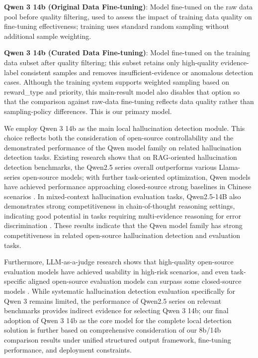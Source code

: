 \documentclass[11pt]{article}
\begin{document}
\textbf{Qwen 3 14b (Original Data Fine-tuning)}: Model fine-tuned on the raw data pool before quality filtering, used to assess the impact of training data quality on fine-tuning effectiveness; training uses standard random sampling without additional sample weighting.

\textbf{Qwen 3 14b (Curated Data Fine-tuning)}: Model fine-tuned on the training data subset after quality filtering; this subset retains only high-quality evidence-label consistent samples and removes insufficient-evidence or anomalous detection cases. Although the training system supports weighted sampling based on reward\_type and priority, this main-result model also disables that option so that the comparison against raw-data fine-tuning reflects data quality rather than sampling-policy differences. This is our primary model.

We employ Qwen 3 14b as the main local hallucination detection module. This choice reflects both the consideration of open-source controllability and the demonstrated performance of the Qwen model family on related hallucination detection tasks. Existing research shows that on RAG-oriented hallucination detection benchmarks, the Qwen2.5 series overall outperforms various Llama-series open-source models; with further task-oriented optimization, Qwen models have achieved performance approaching closed-source strong baselines in Chinese scenarios \citep{jiang2025bianHallucination}. In mixed-context hallucination evaluation tasks, Qwen2.5-14B also demonstrates strong competitiveness in chain-of-thought reasoning settings, indicating good potential in tasks requiring multi-evidence reasoning for error discrimination \citep{qi2025mixedContextHallucination}. These results indicate that the Qwen model family has strong competitiveness in related open-source hallucination detection and evaluation tasks.

Furthermore, LLM-as-a-judge research shows that high-quality open-source evaluation models have achieved usability in high-risk scenarios, and even task-specific aligned open-source evaluation models can surpass some closed-source models \citep{croxford2025clinicalAISummaries,ravi2024lynxEvaluation}. While systematic hallucination detection evaluation specifically for Qwen 3 remains limited, the performance of Qwen2.5 series on relevant benchmarks provides indirect evidence for selecting Qwen 3 14b; our final adoption of Qwen 3 14b as the core model for the complete local detection solution is further based on comprehensive consideration of our 8b/14b comparison results under unified structured output framework, fine-tuning performance, and deployment constraints.
\end{document}
